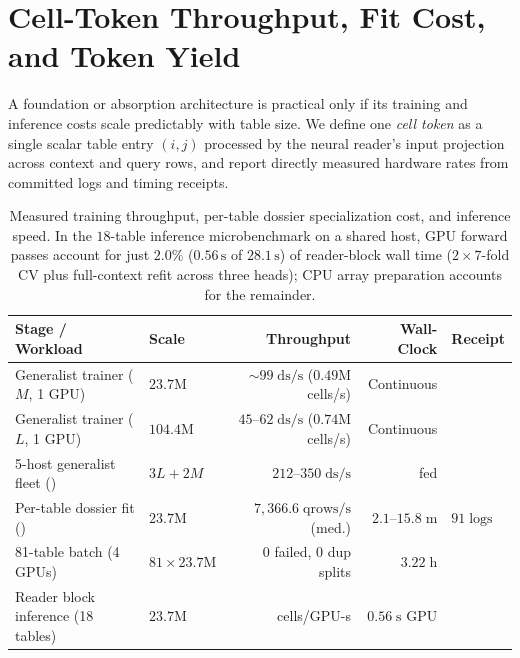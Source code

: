 \section{Cell-Token Throughput, Fit Cost, and Token Yield}
\label{sec:throughput}

A foundation or absorption architecture is practical only if its training and inference costs scale predictably with table size. We define one \emph{cell token} as a single scalar table entry $(i, j)$ processed by the neural reader's input projection across context and query rows, and report directly measured hardware rates from committed logs and timing receipts.

\begin{table}[t]
\centering
\sffamily\footnotesize\lining
\setlength\tabcolsep{4.5pt}
\begin{tabularx}{\linewidth}{@{}Llrrl@{}}
\toprule
Stage / Workload & Scale & Throughput & Wall-Clock & Receipt \\
\midrule
Generalist trainer ($M$, 1 GPU) & $23.7\mathrm{M}$ & ${\sim}99\;\text{ds/s}$ ($0.49\mathrm{M}$ cells/s) & Continuous &  \\
Generalist trainer ($L$, 1 GPU) & $104.4\mathrm{M}$ & $45$--$62\;\text{ds/s}$ ($0.74\mathrm{M}$ cells/s) & Continuous &  \\
5-host generalist fleet () & $3L + 2M$ & $212$--$350\;\text{ds/s}$ & \BHTotalDatasetsFed{} fed &  \\
Per-table dossier fit () & $23.7\mathrm{M}$ & $7{,}366.6\;\text{qrows/s}$ (med.) & $2.1$--$15.8\;\text{m}$ & $91\;\text{logs}$ \\
81-table  batch (4 GPUs) & $81\times 23.7\mathrm{M}$ & $0$ failed, $0$ dup splits & $3.22\;\text{h}$ &  \\
Reader block inference (18 tables) & $23.7\mathrm{M}$ & \BHInferGpuCellsPerSec{} cells/GPU-s & $0.56\;\text{s}$ GPU &  \\
\bottomrule
\end{tabularx}
\caption{Measured training throughput, per-table dossier specialization cost, and inference speed. In the $18$-table inference microbenchmark on a shared host, GPU forward passes account for just $2.0\%$ ($0.56\,\mathrm{s}$ of $28.1\,\mathrm{s}$) of reader-block wall time ($2\times 7$-fold CV plus full-context refit across three heads); CPU array preparation accounts for the remainder.}
\label{tab:throughput}
\end{table}

